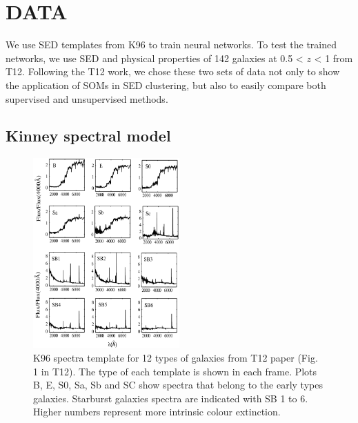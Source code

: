 
\section{DATA}
\label{sec: data}
We use SED templates from K96 to train neural networks.
To test the trained networks, we use SED and physical properties of 142 galaxies at 0.5 < $z$ < 1 from T12.
Following the T12 work, we chose these two sets of data not only to show the application of SOMs in SED clustering, but also to easily compare both supervised and unsupervised methods.

 \subsection{Kinney spectral model}
     \begin{figure}
        \centering
        \includegraphics[width=0.5\textwidth]{images/k96.jpg}
        \caption{K96 spectra template for 12 types of galaxies from T12 paper (Fig. 1 in T12). The type of each template is shown in each frame. Plots B, E, S0, Sa, Sb and SC show spectra that belong to the early types galaxies. Starburst galaxies spectra are indicated with SB 1 to 6. Higher numbers represent more intrinsic colour extinction.}
        \label{fig: k96}
    \end{figure}
      
